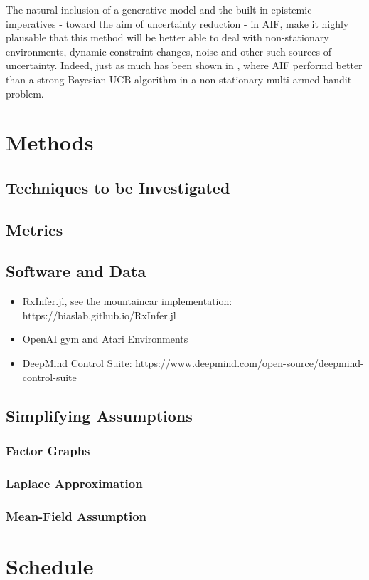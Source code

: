 \documentclass[12pt, twoside]{report}
\begin{document}
The natural inclusion of a generative model and the built-in epistemic imperatives - toward the aim of uncertainty reduction - in AIF, make it highly plausable that this method will be better able to deal with non-stationary environments, dynamic constraint changes, noise and other such sources of uncertainty. Indeed, just as much has been shown in \textcite{Bandits}, where AIF performd better than a strong Bayesian UCB algorithm in a non-stationary multi-armed bandit problem. 



\section{Methods}

\subsection{Techniques to be Investigated}

\subsection{Metrics}

\subsection{Software and Data}
\begin{itemize}
\item RxInfer.jl, see the mountaincar implementation: https://biaslab.github.io/RxInfer.jl
\item OpenAI gym and Atari Environments
\item DeepMind Control Suite: https://www.deepmind.com/open-source/deepmind-control-suite
\end{itemize}


\subsection{Simplifying Assumptions}

\subsubsection{Factor Graphs}

\subsubsection{Laplace Approximation}

\subsubsection{Mean-Field Assumption}



\section{Schedule}

\printbibliography
\end{document}
